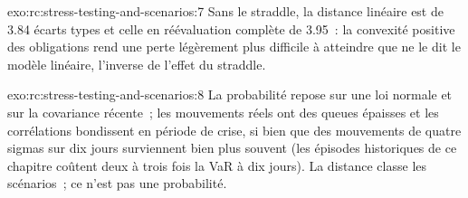 \begin{solution}{exo:rc:stress-testing-and-scenarios:7}
Sans le straddle, la distance linéaire est de 3.84 écarts types et celle en réévaluation complète de
3.95~: la convexité positive des obligations rend une perte légèrement plus difficile à atteindre que ne le dit le modèle linéaire,
l'inverse de l'effet du straddle.
\end{solution}

\begin{solution}{exo:rc:stress-testing-and-scenarios:8}
La probabilité repose sur une loi normale et sur la covariance récente~; les mouvements réels ont des queues épaisses et
les corrélations bondissent en période de crise, si bien que des mouvements de quatre sigmas sur dix jours surviennent bien plus souvent
(les épisodes historiques de ce chapitre coûtent deux à trois fois la VaR à dix jours). La distance classe
les scénarios~; ce n'est pas une probabilité.
\end{solution}

